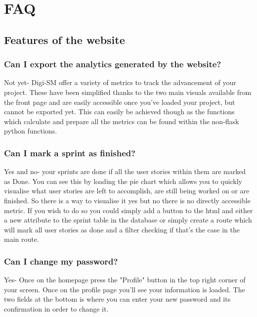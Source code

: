 \documentclass{article}
\begin{document}
\newpage

\section{FAQ}


\subsection{Features of the website}

\subsubsection{Can I export the analytics generated by the website?}

Not yet- Digi-SM offer a variety of metrics to track the advancement of your project. These have been simplified thanks to the two main visuals available from the front page and are easily accessible once you've loaded your project, but cannot be exported yet. This can easily be achieved though as the functions which calculate and prepare all the metrics can be found within the non-flask python functions.

\subsubsection{Can I mark a sprint as finished?}

Yes and no- your sprints are done if all the user stories within them are marked as Done. You can see this by loading the pie chart which allows you to quickly visualise what user stories are left to accomplish, are still being worked on or are finished.
So there is a way to visualise it yes but no there is no directly accessible metric. If you wish to do so you could simply add a button to the html and either a new attribute to the sprint table in the database or simply create a route which will mark all user stories as done and a filter checking if that's the case in the main route.


\subsubsection{Can I change my password?}

Yes- Once on the homepage press the "Profile" button in the top right corner of your screen. Once on the profile page you’ll see your information is loaded. The two fields at the bottom is where you can enter your new password and its confirmation in order to change it.
\end{document}
